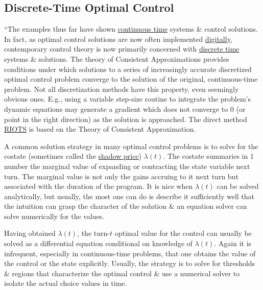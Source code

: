 \documentclass{article}
\begin{document}
\subsection{Discrete-Time Optimal Control}
``The examples thus far have shown \href{https://en.wikipedia.org/wiki/Continuous_time}{continuous time} systems \& control solutions. In fact, as optimal control solutions are now often implemented \href{https://en.wikipedia.org/wiki/Digital_data}{digitally}, contemporary control theory is now primarily concerned with \href{https://en.wikipedia.org/wiki/Discrete_time}{discrete time} systems \& solutions. The theory of Consistent Approximations provides conditions under which solutions to a series of increasingly accurate discretized optimal control problem converge to the solution of the original, continuous-time problem. Not all discretization methods have this property, even seemingly obvious ones. E.g., using a variable step-size routine to integrate the problem's dynamic equations may generate a gradient which does not converge to 0 (or point in the right direction) as the solution is approached. The direct method \href{http://www.schwartz-home.com/RIOTS}{RIOTS} is based on the Theory of Consistent Approximation.

A common solution strategy in many optimal control problems is to solve for the costate (sometimes called the \href{https://en.wikipedia.org/wiki/Shadow_price}{shadow price}) $\lambda(t)$. The costate summaries in 1 number the marginal value of expanding or contracting the state variable next turn. The marginal value is not only the gains accruing to it next turn but associated with the duration of the program. It is nice when $\lambda(t)$ can be solved analytically, but usually, the most one can do is describe it sufficiently well that the intuition can grasp the character of the solution \& an equation solver can solve numerically for the values.

Having obtained $\lambda(t)$, the turn-$t$ optimal value for the control can usually be solved as a differential equation conditional on knowledge of $\lambda(t)$. Again it is infrequent, especially in continuous-time problems, that one obtains the value of the control or the state explicitly. Usually, the strategy is to solve for thresholds \& regions that characterize the optimal control \& use a numerical solver to isolate the actual choice values in time.
\end{document}
